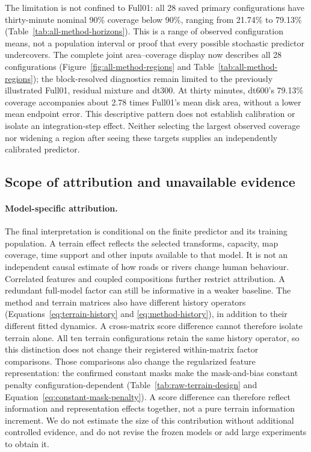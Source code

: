 \documentclass[11pt]{article}
\begin{document}
The limitation is not confined to Full01: all 28 saved primary configurations
have thirty-minute nominal 90\% coverage below 90\%, ranging from 21.74\%
to 79.13\% (Table~\ref{tab:all-method-horizons}). This is a range of observed
configuration means, not a population interval or proof that every possible
stochastic predictor undercovers. The complete joint area--coverage display
now describes all 28 configurations (Figure~\ref{fig:all-method-regions} and
Table~\ref{tab:all-method-regions}); the block-resolved diagnostics remain
limited to the previously illustrated Full01, residual mixture and dt300.
At thirty minutes, dt600's 79.13\% coverage accompanies about 2.78 times
Full01's mean disk area, without a lower mean endpoint error. This descriptive
pattern does not establish calibration or isolate an integration-step effect.
Neither selecting the largest observed coverage nor widening a region after
seeing these targets supplies an independently calibrated predictor.

\subsection{Scope of attribution and unavailable evidence}
\label{sec:discussion-scope}
\paragraph{Model-specific attribution.}
The final interpretation is conditional on the finite predictor and its
training population. A terrain effect reflects the selected transforms,
capacity, map coverage, time support and other inputs available to that model.
It is not an independent causal estimate of how roads or rivers change human
behaviour. Correlated features and coupled compositions further restrict
attribution. A redundant full-model factor can still be informative in a
weaker baseline.
The method and terrain matrices also have different history operators
(Equations~\eqref{eq:terrain-history} and \eqref{eq:method-history}), in addition
to their different fitted dynamics. A cross-matrix score difference cannot
therefore isolate terrain alone. All ten terrain configurations retain the
same history operator, so this distinction does not change their registered
within-matrix factor comparisons.
Those comparisons also change the regularized feature representation:
the confirmed constant masks make the mask-and-bias constant penalty
configuration-dependent (Table~\ref{tab:raw-terrain-design} and
Equation~\eqref{eq:constant-mask-penalty}). A score difference can therefore
reflect information and representation effects together, not a pure terrain
information increment. We do not estimate the size of this contribution
without additional controlled evidence, and do not revise the frozen
models or add large experiments to obtain it.
\end{document}
